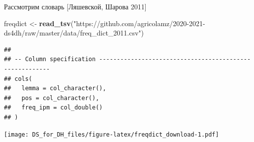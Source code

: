 \documentclass[
]{book}
\newenvironment{Shaded}{\begin{snugshade}}{\end{snugshade}}
\newcommand{\DataTypeTok}[1]{\textcolor[rgb]{0.13,0.29,0.53}{#1}}
\newcommand{\DecValTok}[1]{\textcolor[rgb]{0.00,0.00,0.81}{#1}}
\newcommand{\KeywordTok}[1]{\textcolor[rgb]{0.13,0.29,0.53}{\textbf{#1}}}
\newcommand{\NormalTok}[1]{#1}
\newcommand{\OperatorTok}[1]{\textcolor[rgb]{0.81,0.36,0.00}{\textbf{#1}}}
\newcommand{\StringTok}[1]{\textcolor[rgb]{0.31,0.60,0.02}{#1}}
\begin{document}
Рассмотрим словарь {[}Ляшевской, Шарова 2011{]}

\begin{Shaded}
\begin{Highlighting}[]
\NormalTok{freqdict <-}\StringTok{ }\KeywordTok{read_tsv}\NormalTok{(}\StringTok{"https://github.com/agricolamz/2020-2021-ds4dh/raw/master/data/freq_dict_2011.csv"}\NormalTok{)}
\end{Highlighting}
\end{Shaded}

\begin{verbatim}
## 
## -- Column specification --------------------------------------------------------
## cols(
##   lemma = col_character(),
##   pos = col_character(),
##   freq_ipm = col_double()
## )
\end{verbatim}

\begin{Shaded}
\end{Shaded}

\texttt{[image: DS\_for\_DH\_files/figure-latex/freqdict\_download-1.pdf]}

\begin{Shaded}
\end{Shaded}
\end{document}
